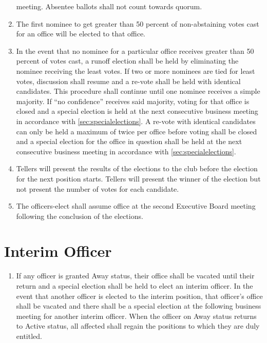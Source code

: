 \documentclass[12pt,letterpaper,oneside]{book}
\begin{document}
\begin{enumerate}
    meeting. Absentee ballots shall not count towards quorum. \item The first
    nominee to get greater than 50 percent of non-abstaining votes cast for an
    office will be elected to that office.
\item  In the event that no nominee for a particular office receives greater than 50 percent of votes cast, a runoff election shall be held by eliminating the nominee receiving the least votes. If two or more nominees are tied for least votes, discussion shall resume and a re-vote shall be held with identical candidates. This procedure shall continue until one nominee receives a simple majority. If “no confidence” receives said majority, voting for that office is closed and a special election is held at the next consecutive business meeting in accordance with \cref{sec:specialelections}. A re-vote with identical candidates can only be held a maximum of twice per office before voting shall be closed and a special election for the office in question shall be held at the next consecutive business meeting in accordance with \cref{sec:specialelections}.
\item Tellers will present the results of the elections to the club before the election for the next position starts. Tellers will present the winner of the election but not present the number of votes for each candidate. 
\item The officers-elect shall assume office at the second Executive Board meeting following the conclusion of the elections.
\end{enumerate}

\section{Interim Officer}

\begin{enumerate}

\item If any officer is granted Away status, their office shall be vacated until their return and a special election shall be held to elect an interim officer. In the event that another officer is elected to the interim position, that officer’s office shall be vacated and there shall be a special election at the following business meeting for another interim officer. When the officer on Away status returns to Active status, all affected shall regain the positions to which they are duly entitled.

\end{enumerate}
\end{document}
